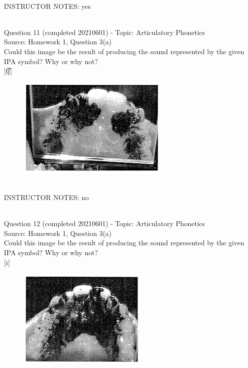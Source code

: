 \documentclass[12pt]{article}
\begin{document}
~\\
INSTRUCTOR NOTES: yes


~\\

{\large Question 11} (completed 20210601) - Topic: Articulatory Phonetics\\
Source: Homework 1, Question 3(a)\\

Could this image be the result of producing the sound represented by the given IPA symbol? Why or why not?\\

{[t͡ʃ]}

\begin{figure}[H]
\includegraphics{../images/staticpalatography_fricative.png}
\end{figure}

~\\
INSTRUCTOR NOTES: no


~\\

{\large Question 12} (completed 20210601) - Topic: Articulatory Phonetics\\
Source: Homework 1, Question 3(a)\\

Could this image be the result of producing the sound represented by the given IPA symbol? Why or why not?\\

{[ɾ]}

\begin{figure}[H]
\includegraphics{../images/staticpalatography_stop.png}
\end{figure}
\end{document}
